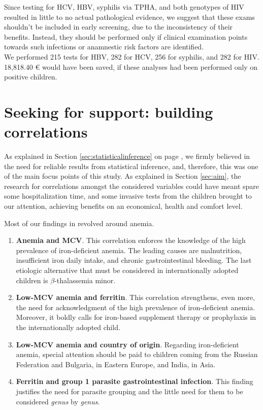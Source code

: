 Since testing for HCV, HBV, syphilis via TPHA, and both genotypes of HIV resulted in little to no actual pathological evidence, we suggest that these exams shouldn't be included in early screening, due to the inconsistency of their benefits. Instead, they should be performed only if clinical examination points towards such infections or anamnestic risk factors are identified.\\
We performed 215 tests for HBV, 282 for HCV, 256 for syphilis, and 282 for HIV. 18,818.40 € would have been saved, if these analyses had been performed only on positive children.

\section{Seeking for support: building correlations}\label{sec:seekingforsupport}
As explained in Section \ref{sec:statisticalinference} on page \pageref{sec:statisticalinference}, we firmly believed in the need for reliable results from statistical inference, and, therefore, this was one of the main focus points of this study. As explained in Section \ref{sec:aim}, the research for correlations amongst the considered variables could have meant spare some hospitalization time, and some invasive tests from the children brought to our attention, achieving benefits on an economical, health and comfort level.

Most of our findings in revolved around anemia.

\begin{enumerate}
	\item \textbf{Anemia and MCV}. This correlation enforces the knowledge of the high prevalence of iron-deficient anemia. The leading causes are malnutrition, insufficient iron daily intake, and chronic gastrointestinal bleeding. The last etiologic alternative that must be considered in internationally adopted children is $\beta$-thalassemia minor.
	\item \textbf{Low-MCV anemia and ferritin}. This correlation strengthens, even more, the need for acknowledgment of the high prevalence of iron-deficient anemia. Moreover, it boldly calls for iron-based supplement therapy or prophylaxis in the internationally adopted child.
	\item \textbf{Low-MCV anemia and country of origin}. Regarding iron-deficient anemia, special attention should be paid to children coming from the Russian Federation and Bulgaria, in Eastern Europe, and India, in Asia.
	\item \textbf{Ferritin and group 1 parasite gastrointestinal infection}. This finding justifies the need for parasite grouping and the little need for them to be considered \textit{genus} by \textit{genus}.
\end{enumerate}


